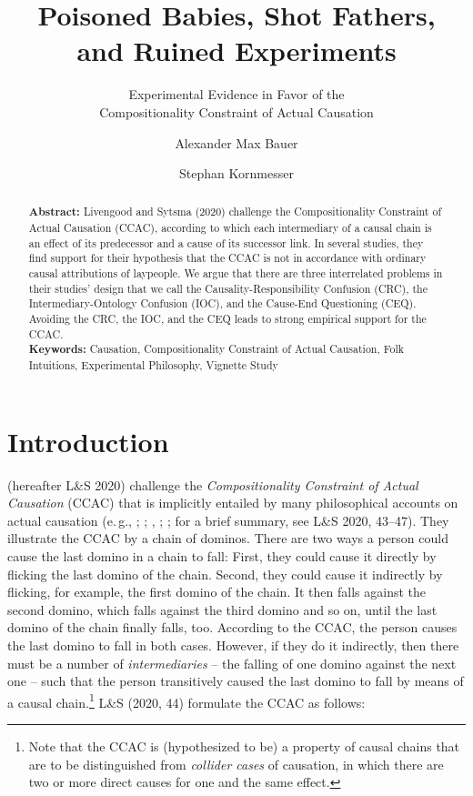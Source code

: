 \documentclass[egregdoesnotlikesansseriftitles,12pt]{scrartcl}
\title{Poisoned Babies, Shot Fathers,\\and Ruined Experiments}
\subtitle{Experimental Evidence in Favor of the\\Compositionality Constraint of Actual Causation}
\author[1*]{Alexander Max Bauer}
\author[1]{Stephan Kornmesser}
\affil[1]{ Department of Philosophy, University of Oldenburg}
\affil[*]{ Corresponding Author, E-Mail: \href{mailto:alexander.max.bauer@uni-oldenburg.de}{alexander.max.bauer@uni-oldenburg.de}}
\date{}
\begin{document}
\maketitle

\begin{abstract}
   \noindent\textbf{Abstract:} Livengood and Sytsma (2020) challenge the Compositionality Constraint of Actual Causation (CCAC), according to which each intermediary of a causal chain is an effect of its predecessor and a cause of its successor link. In several studies, they find support for their hypothesis that the CCAC is not in accordance with ordinary causal attributions of laypeople. We argue that there are three interrelated problems in their studies’ design that we call the Causality-Responsibility Confusion (CRC), the Intermediary-Ontology Confusion (IOC), and the Cause-End Questioning (CEQ). Avoiding the CRC, the IOC, and the CEQ leads to strong empirical support for the CCAC.\\[2ex]
   \textbf{Keywords:} Causation, Compositionality Constraint of Actual Causation, Folk Intuitions, Experimental Philosophy, Vignette Study\\[2ex]
\end{abstract}

\clearpage
\section{Introduction}\label{sec:introduction}
\citet{livengood_actual_2020} (hereafter L\&S 2020) challenge the \textit{Compositionality Constraint of Actual Causation} (CCAC) that is implicitly entailed by many philosophical accounts on actual causation (e.\,g., \cite{reichenbach_direction_1956}; \cite{salmon_causality_1994}; \cite{dowe_causality_1995}, \cite{ehring_causation_1997}; \cite{lewis_causation_1973,lewis_postscripts_1986}; for a brief summary, see L\&S 2020, 43--47). They illustrate the CCAC by a chain of dominos. There are two ways a person could cause the last domino in a chain to fall: First, they could cause it directly by flicking the last domino of the chain. Second, they could cause it indirectly by flicking, for example, the first domino of the chain. It then falls against the second domino, which falls against the third domino and so on, until the last domino of the chain finally falls, too. According to the CCAC, the person causes the last domino to fall in both cases. However, if they do it indirectly, then there must be a number of \textit{intermediaries} -- the falling of one domino against the next one -- such that the person transitively caused the last domino to fall by means of a causal chain.\footnote{Note that the CCAC is (hypothesized to be) a property of causal chains that are to be distinguished from \textit{collider cases} of causation, in which there are two or more direct causes for one and the same effect.} L\&S (2020, 44) formulate the CCAC as follows:
\end{document}
